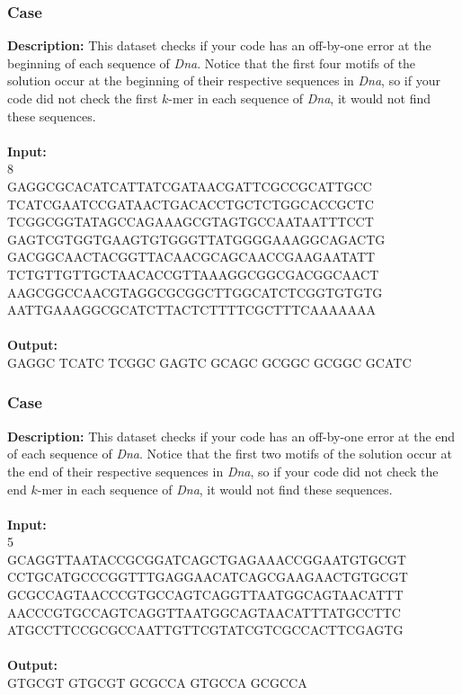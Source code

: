 \documentclass{article}
\newcommand{\code}[1]{{\fontfamily{pcr}\selectfont #1}}
\begin{document}
\subsubsection*{Case }
\hline \vspace{5}
\textbf{Description:} This dataset checks if your code has an off-by-one error at the beginning of each sequence of \emph{Dna}. Notice that the first four motifs of the solution occur at the beginning of their respective sequences in \emph{Dna}, so if your code did not check the first $k$-mer in each sequence of 
\emph{Dna}, it would not find these sequences.\\ \\
\noindent \textbf{Input:}\\
\code{5 8\\GAGGCGCACATCATTATCGATAACGATTCGCCGCATTGCC\\TCATCGAATCCGATAACTGACACCTGCTCTGGCACCGCTC\\TCGGCGGTATAGCCAGAAAGCGTAGTGCCAATAATTTCCT\\GAGTCGTGGTGAAGTGTGGGTTATGGGGAAAGGCAGACTG\\GACGGCAACTACGGTTACAACGCAGCAACCGAAGAATATT\\TCTGTTGTTGCTAACACCGTTAAAGGCGGCGACGGCAACT\\AAGCGGCCAACGTAGGCGCGGCTTGGCATCTCGGTGTGTG\\AATTGAAAGGCGCATCTTACTCTTTTCGCTTTCAAAAAAA}\\ \\
\noindent \textbf{Output:}\\
\code{GAGGC TCATC TCGGC GAGTC GCAGC GCGGC GCGGC GCATC}

\subsubsection*{Case }
\hline \vspace{5}
\textbf{Description:} This dataset checks if your code has an off-by-one error at the end of each sequence of \emph{Dna}. Notice that the first two motifs of the solution occur at the end of their respective sequences in \emph{Dna}, so if your code did not check the end $k$-mer in each sequence of \emph{Dna}, it would not find 
these sequences.\\ \\
\noindent \textbf{Input:}\\
\code{6 5\\GCAGGTTAATACCGCGGATCAGCTGAGAAACCGGAATGTGCGT\\CCTGCATGCCCGGTTTGAGGAACATCAGCGAAGAACTGTGCGT\\GCGCCAGTAACCCGTGCCAGTCAGGTTAATGGCAGTAACATTT\\AACCCGTGCCAGTCAGGTTAATGGCAGTAACATTTATGCCTTC\\ATGCCTTCCGCGCCAATTGTTCGTATCGTCGCCACTTCGAGTG}\\ \\
\noindent \textbf{Output:}\\
\code{GTGCGT GTGCGT GCGCCA GTGCCA GCGCCA}
\pagebreak
\end{document}
